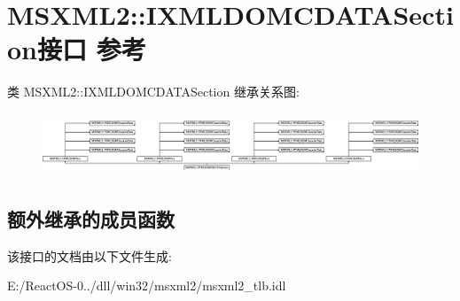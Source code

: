 \hypertarget{interface_m_s_x_m_l2_1_1_i_x_m_l_d_o_m_c_d_a_t_a_section}{}\section{M\+S\+X\+M\+L2\+:\+:I\+X\+M\+L\+D\+O\+M\+C\+D\+A\+T\+A\+Section接口 参考}
\label{interface_m_s_x_m_l2_1_1_i_x_m_l_d_o_m_c_d_a_t_a_section}
类 M\+S\+X\+M\+L2\+:\+:I\+X\+M\+L\+D\+O\+M\+C\+D\+A\+T\+A\+Section 继承关系图\+:\begin{figure}[H]
\begin{center}
\leavevmode
\includegraphics[height=1.875000cm]{interface_m_s_x_m_l2_1_1_i_x_m_l_d_o_m_c_d_a_t_a_section}
\end{center}
\end{figure}
\subsection*{额外继承的成员函数}


该接口的文档由以下文件生成\+:\begin{DoxyCompactItemize}
\item 
E\+:/\+React\+O\+S-\/0../dll/win32/msxml2/msxml2\+\_\+tlb.\+idl\end{DoxyCompactItemize}
